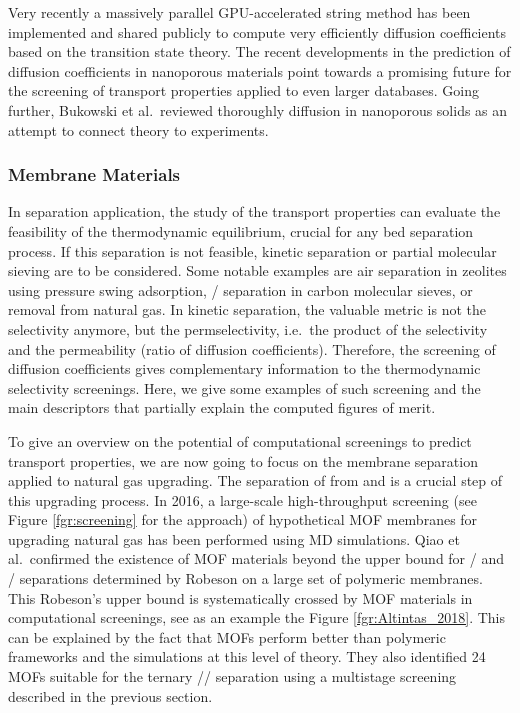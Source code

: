 \documentclass[main.tex]{subfiles}
\begin{document}
Very recently a massively parallel GPU-accelerated string method has been implemented and shared publicly to compute very efficiently diffusion coefficients {based on the transition state theory}.\cite{Zhou_2021} The recent developments in the prediction of diffusion coefficients in nanoporous materials point towards a promising future for the screening of transport properties applied to even larger databases. Going further, Bukowski et al.\ reviewed thoroughly diffusion in nanoporous solids as an attempt to connect theory to experiments.\cite{Bukowski_2021}

\subsubsection{Membrane Materials}

In separation application, the study of the transport properties can evaluate the feasibility of the thermodynamic equilibrium, crucial for any bed separation process. If this separation is not feasible, kinetic separation or partial molecular sieving are to be considered. Some notable examples are air separation in zeolites using pressure swing adsorption,\cite{ruthven1990air} / separation in carbon molecular sieves,\cite{Reid_1999} or  removal from natural gas.\cite{Wang_2019} In kinetic separation, the valuable metric is not the selectivity anymore, but the permselectivity, i.e.\ the product of the selectivity and the permeability (ratio of diffusion coefficients). Therefore, the screening of diffusion coefficients gives complementary information to the thermodynamic selectivity screenings. Here, we give some examples of such screening and the main descriptors that partially explain the computed figures of merit.

To give an overview on the potential of computational screenings to predict transport properties, we are now going to focus on the membrane separation applied to natural gas upgrading. The separation of  from  and  is a crucial step of this upgrading process.
In 2016, a large-scale high-throughput screening (see Figure \ref{fgr:screening} for the approach) of hypothetical MOF membranes for upgrading natural gas has been performed using MD simulations.\cite{Qiao_2016} Qiao et al.\ confirmed the existence of MOF materials beyond the upper bound for / and / separations determined by Robeson on a large set of polymeric membranes.\cite{robeson1991correlation} This Robeson's upper bound is systematically crossed by MOF materials in computational screenings, see as an example the Figure \ref{fgr:Altintas_2018}. This can be explained by the fact that MOFs perform better than polymeric frameworks and the simulations at this level of theory. They also identified 24 MOFs suitable for the ternary // separation using a multistage screening described in the previous section.
\end{document}
